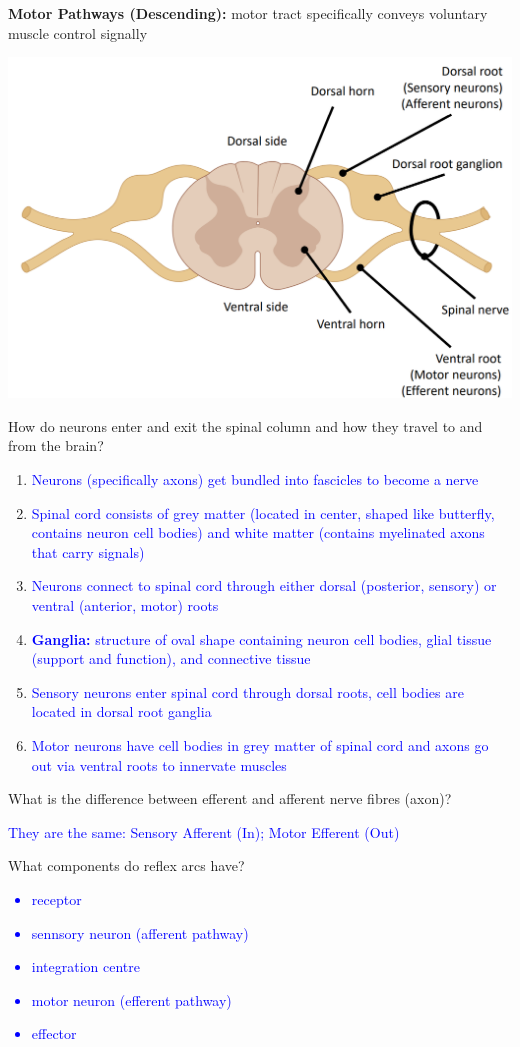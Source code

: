 \documentclass[11pt,fleqn]{book}
\begin{document}
\textbf{Motor Pathways (Descending):} motor tract specifically conveys voluntary muscle control signally
\begin{center}
    \includegraphics[width=0.65\linewidth]{Pictures/Screenshot 2024-03-06 201615.png}
\end{center}
\begin{exercise}
    How do neurons enter and exit the spinal column and how they travel to and from the brain?
    \begin{enumerate}
        \item \textcolor{blue}{Neurons (specifically axons) get bundled into fascicles to become a nerve} 
        \item \textcolor{blue}{Spinal cord consists of grey matter (located in center, shaped like butterfly, contains neuron cell bodies) and white matter (contains myelinated axons that carry signals)}
        \item \textcolor{blue}{Neurons connect to spinal cord through either dorsal (posterior, sensory) or ventral (anterior, motor) roots}
        \item \textcolor{blue}{\textbf{Ganglia:} structure of oval shape containing neuron cell bodies, glial tissue (support and function), and connective tissue}
        \item \textcolor{blue}{Sensory neurons enter spinal cord through dorsal roots, cell bodies are located in dorsal root ganglia}
        \item \textcolor{blue}{Motor neurons have cell bodies in grey matter of spinal cord and axons go out via ventral roots to innervate muscles}
    \end{enumerate}
\end{exercise}
\begin{exercise}
    What is the difference between efferent and afferent nerve fibres (axon)?

    \textcolor{blue}{They are the same: Sensory Afferent (In); Motor Efferent (Out)}
\end{exercise}
\begin{exercise}
    What components do reflex arcs have?
    \textcolor{blue}{
    \begin{itemize}
        \item receptor
        \item sennsory neuron (afferent pathway)
        \item integration centre
        \item motor neuron (efferent pathway)
        \item effector
    \end{itemize}
    }
\end{exercise}
\end{document}
